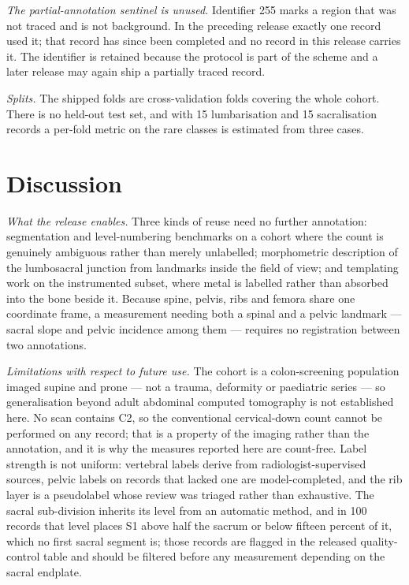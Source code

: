 \documentclass[aapm,mph,amsmath,amssymb,reprint,linenumbers]{revtex4-2}
\begin{document}
\emph{The partial-annotation sentinel is unused.} Identifier 255 marks a region that was not
traced and is not background. In the preceding release exactly one record used it; that
record has since been completed and no record in this release carries it. The identifier is
retained because the protocol is part of the scheme and a later release may again ship a
partially traced record.

\emph{Splits.} The shipped folds are cross-validation folds covering the whole cohort.
There is no held-out test set, and with 15 lumbarisation and 15 sacralisation records a
per-fold metric on the rare classes is estimated from three cases.

\section{Discussion}

\emph{What the release enables.} Three kinds of reuse need no further annotation:
segmentation and level-numbering benchmarks on a cohort where the count is genuinely
ambiguous rather than merely unlabelled; morphometric description of the lumbosacral
junction from landmarks inside the field of view; and templating work on the instrumented
subset, where metal is labelled rather than absorbed into the bone beside it. Because spine,
pelvis, ribs and femora share one coordinate frame, a measurement needing both a spinal and
a pelvic landmark --- sacral slope and pelvic incidence among them --- requires no
registration between two annotations.

\emph{Limitations with respect to future use.} The cohort is a colon-screening population
imaged supine and prone --- not a trauma, deformity or paediatric series --- so
generalisation beyond adult abdominal computed tomography is not established here. No scan
contains C2, so the conventional cervical-down count cannot be performed on any record;
that is a property of the imaging rather than the annotation, and it is why the measures
reported here are count-free. Label strength is not uniform: vertebral labels derive from
radiologist-supervised sources, pelvic labels on records that lacked one are model-completed,
and the rib layer is a pseudolabel whose review was triaged rather than exhaustive. The
sacral sub-division inherits its level from an automatic method, and in 100 records that
level places S1 above half the sacrum or below fifteen percent of it, which no first sacral
segment is; those records are flagged in the released quality-control table and should be
filtered before any measurement depending on the sacral endplate.
\end{document}
